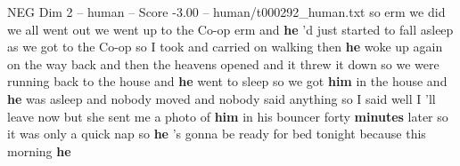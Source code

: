 \begin{textsample}{NEG Dim 2 – human – Score -3.00 – human/t000292\_human.txt}  \label{ex:f2_neg_004}
so erm we did we all went out we went up to the Co-op erm and \textbf{he} 'd just started to fall asleep as we got to the Co-op so I took and carried on walking then \textbf{he} woke up again on the way back and then the heavens opened and it threw it down so we were running back to the house and \textbf{he} went to sleep so we got \textbf{him} in the house and \textbf{he} was asleep and nobody moved and nobody said anything so I said well I 'll leave now but she sent me a photo of \textbf{him} in his bouncer forty \textbf{minutes} later so it was only a quick nap so \textbf{he} 's gonna be ready for bed tonight because this morning \textbf{he}

\end{textsample}
